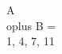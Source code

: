 \documentclass[preview]{standalone}
\begin{document}
\begin{center}
A \\oplus B = \\{1, 4, 7, 11\\}
\end{center}
\end{document}
